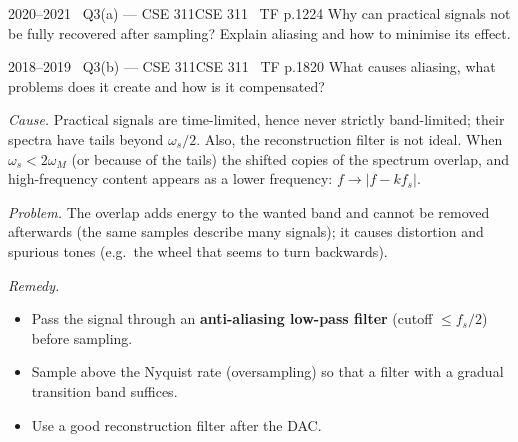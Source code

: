 \begin{qcard}{2020--2021 \textbullet\ Q3(a) --- CSE 311}{CSE 311 \textbullet\ TF p.12}{24}
Why can practical signals not be fully recovered after sampling? Explain aliasing and how to minimise its effect.
\end{qcard}
\begin{qcard}{2018--2019 \textbullet\ Q3(b) --- CSE 311}{CSE 311 \textbullet\ TF p.18}{20}
What causes aliasing, what problems does it create and how is it compensated?
\end{qcard}
\begin{solution}
\emph{Cause.} Practical signals are time-limited, hence never strictly band-limited; their spectra have tails beyond $\omega_s/2$. Also, the reconstruction filter is not ideal. When $\omega_s<2\omega_M$ (or because of the tails) the shifted copies of the spectrum overlap, and high-frequency content appears as a lower frequency: $f\to|f-kf_s|$.

\emph{Problem.} The overlap adds energy to the wanted band and cannot be removed afterwards (the same samples describe many signals); it causes distortion and spurious tones (e.g.\ the wheel that seems to turn backwards).

\emph{Remedy.}
\begin{itemize}[leftmargin=1.4em,itemsep=1pt]
\item Pass the signal through an \textbf{anti-aliasing low-pass filter} (cutoff $\le f_s/2$) before sampling.
\item Sample above the Nyquist rate (oversampling) so that a filter with a gradual transition band suffices.
\item Use a good reconstruction filter after the DAC.
\end{itemize}
\end{solution}

